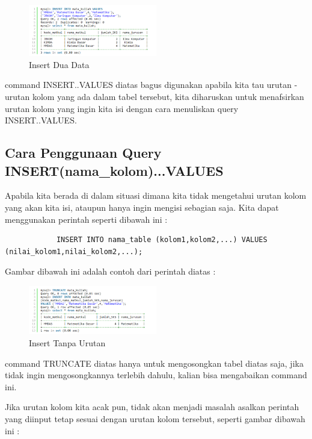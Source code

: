 	\begin{figure}[ht]
			\centerline{\includegraphics[width=0.5\textwidth]{figures/insert2.png}}
			\caption{Insert Dua Data}
			\label{insert2}
			\end{figure}
	
	command INSERT..VALUES diatas bagus digunakan apabila kita tau urutan - urutan kolom yang ada dalam tabel tersebut, kita diharuskan untuk menafsirkan urutan kolom yang ingin kita isi dengan cara menuliskan query INSERT..VALUES.
	
	\subsection{Cara Penggunaan Query INSERT(nama_kolom)...VALUES}
	Apabila kita berada di dalam situasi dimana kita tidak mengetahui urutan kolom yang akan kita isi, ataupun hanya ingin mengisi sebagian saja. Kita dapat menggunakan perintah seperti dibawah ini :
		\begin{verbatim}
			INSERT INTO nama_table (kolom1,kolom2,...) VALUES (nilai_kolom1,nilai_kolom2,...);
		\end{verbatim}
		
	Gambar dibawah ini adalah contoh dari perintah diatas :
	
		\begin{figure}[ht]
			\centerline{\includegraphics[width=0.5\textwidth]{figures/insert3.png}}
			\caption{Insert Tanpa Urutan}
			\label{insert3}
			\end{figure}
			
	command TRUNCATE diatas hanya untuk mengosongkan tabel diatas saja, jika tidak ingin mengosongkannya terlebih dahulu, kalian bisa mengabaikan command ini.
	
	Jika urutan kolom kita acak pun, tidak akan menjadi masalah asalkan perintah yang diinput tetap sesuai dengan urutan kolom tersebut, seperti gambar dibawah ini :
	
